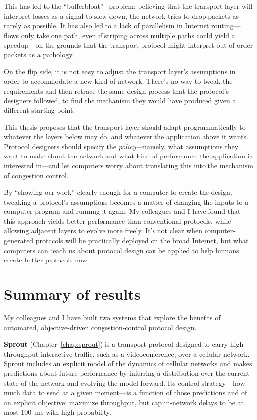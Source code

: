 This has led to the ``bufferbloat''~\cite{bufferbloat} problem:
believing that the transport layer will interpret losses as a signal
to slow down, the network tries to drop packets as rarely as
possible. It has also led to a lack of parallelism in Internet
routing---flows only take one path, even if striping across
multiple paths could yield a speedup---on the grounds that the
transport protocol might interpret out-of-order packets as a
pathology.

On the flip side, it is not easy to adjust the transport
layer's assumptions in order to accommodate a new kind of
network. There's no way to tweak the requirements and then retrace the
same design process that the protocol's designers followed, to find the
mechanism they would have produced given a different starting point.


This thesis proposes that the transport layer should adapt
programmatically to whatever the layers below may do, and whatever the
application above it wants. Protocol designers should specify the
\emph{policy}---namely, what assumptions they want to make about the
network and what kind of performance the application is interested
in---and let computers worry about translating this into the mechanism
of congestion control.

By ``showing our work'' clearly enough for a computer to create the
design, tweaking a protocol's assumptions becomes a matter of changing
the inputs to a computer program and running it again. My colleagues
and I have found that this approach yields better performance than
conventional protocols, while allowing adjacent layers to evolve more
freely. It's not clear when computer-generated protocols will be
practically deployed on the broad Internet, but what computers can
teach us about protocol design can be applied to help humans create
better protocols now.

\section{Summary of results}

My colleagues and I have built two systems that explore the benefits
of automated, objective-driven congestion-control protocol design.

\textbf{Sprout} (Chapter~\ref{chap:sprout}) is a transport protocol
designed to carry high-throughput interactive traffic, such as a
videoconference, over a cellular network. Sprout includes an explicit
model of the dynamics of cellular networks and makes predictions about
future performance by inferring a distribution over the current state
of the network and evolving the model forward. Its control
strategy---how much data to send at a given moment---is a function of
those predictions and of an explicit objective: maximize throughput,
but cap in-network delays to be at most 100~ms with high
probability.

